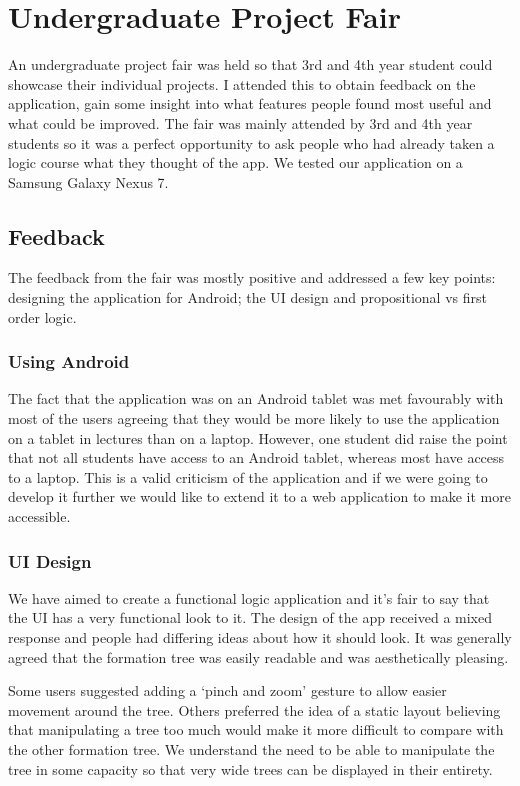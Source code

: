 \documentclass[draft]{report}
\begin{document}
\section{Undergraduate Project Fair}

An undergraduate project fair was held so that 3rd and 4th year student could showcase their individual projects. I attended this to obtain feedback on the application, gain some insight into what features people found most useful and what could be improved. The fair was mainly attended by 3rd and 4th year students so it was a perfect opportunity to ask people who had already taken a logic course what they thought of the app. We tested our application on a Samsung Galaxy Nexus 7.

\subsection{Feedback}

The feedback from the fair was mostly positive and addressed a few key points: designing the application for Android; the UI design and propositional vs first order logic.

\subsubsection{Using Android}

The fact that the application was on an Android tablet was met favourably with most of the users agreeing that they would be more likely to use the application on a tablet in lectures than on a laptop. However, one student did raise the point that not all students have access to an Android tablet, whereas most have access to a laptop. This is a valid criticism of the application and if we were going to develop it further we would like to extend it to a web application to make it more accessible.

\subsubsection{UI Design}

We have aimed to create a functional logic application and it's fair to say that the UI has a very functional look to it. The design of the app received a mixed response and people had differing ideas about how it should look. It was generally agreed that the formation tree was easily readable and was aesthetically pleasing. 

Some users suggested adding a `pinch and zoom' gesture to allow easier movement around the tree. Others preferred the idea of a static layout believing that manipulating a tree too much would make it more difficult to compare with the other formation tree. We understand the need to be able to manipulate the tree in some capacity so that very wide trees can be displayed in their entirety. 
\end{document}

